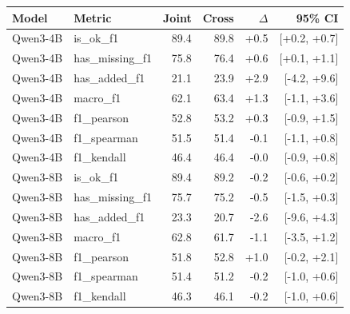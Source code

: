 \begin{tabular}{llrrrr}
\toprule
Model & Metric & Joint & Cross & $\Delta$ & 95\% CI \\
\midrule
Qwen3-4B & is\_ok\_f1 & 89.4 & 89.8 & +0.5 & [+0.2, +0.7] \\
Qwen3-4B & has\_missing\_f1 & 75.8 & 76.4 & +0.6 & [+0.1, +1.1] \\
Qwen3-4B & has\_added\_f1 & 21.1 & 23.9 & +2.9 & [-4.2, +9.6] \\
Qwen3-4B & macro\_f1 & 62.1 & 63.4 & +1.3 & [-1.1, +3.6] \\
Qwen3-4B & f1\_pearson & 52.8 & 53.2 & +0.3 & [-0.9, +1.5] \\
Qwen3-4B & f1\_spearman & 51.5 & 51.4 & -0.1 & [-1.1, +0.8] \\
Qwen3-4B & f1\_kendall & 46.4 & 46.4 & -0.0 & [-0.9, +0.8] \\
Qwen3-8B & is\_ok\_f1 & 89.4 & 89.2 & -0.2 & [-0.6, +0.2] \\
Qwen3-8B & has\_missing\_f1 & 75.7 & 75.2 & -0.5 & [-1.5, +0.3] \\
Qwen3-8B & has\_added\_f1 & 23.3 & 20.7 & -2.6 & [-9.6, +4.3] \\
Qwen3-8B & macro\_f1 & 62.8 & 61.7 & -1.1 & [-3.5, +1.2] \\
Qwen3-8B & f1\_pearson & 51.8 & 52.8 & +1.0 & [-0.2, +2.1] \\
Qwen3-8B & f1\_spearman & 51.4 & 51.2 & -0.2 & [-1.0, +0.6] \\
Qwen3-8B & f1\_kendall & 46.3 & 46.1 & -0.2 & [-1.0, +0.6] \\
\bottomrule
\end{tabular}
